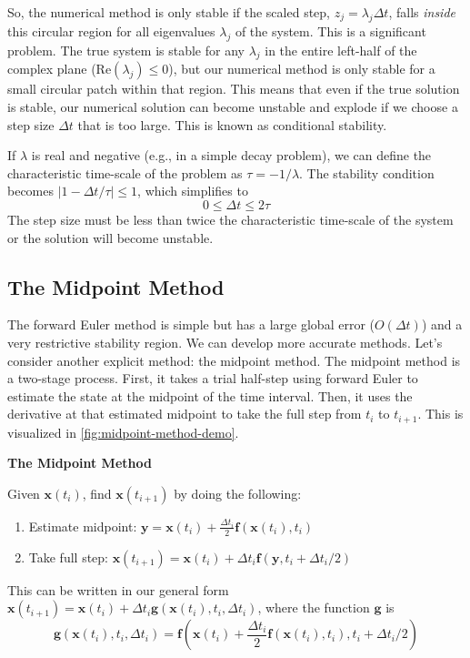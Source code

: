 So, the numerical method is only stable if the scaled step, $z_j = \lambda_j \Delta t$, falls \textit{inside} this circular region for all eigenvalues $\lambda_j$ of the system. This is a significant problem. The true system is stable for any $\lambda_j$ in the entire left-half of the complex plane ($\text{Re}(\lambda_j) \le 0$), but our numerical method is only stable for a small circular patch within that region. This means that even if the true solution is stable, our numerical solution can become unstable and explode if we choose a step size $\Delta t$ that is too large. This is known as conditional stability.

If $\lambda$ is real and negative (e.g., in a simple decay problem), we can define the characteristic time-scale of the problem as $\tau = -1/\lambda$. The stability condition becomes $|1 - \Delta t / \tau| \le 1$, which simplifies to
\begin{equation}
    0 \le \Delta t \le 2\tau
\end{equation}
The step size must be less than twice the characteristic time-scale of the system or the solution will become unstable.

\subsection{The Midpoint Method}

The forward Euler method is simple but has a large global error ($O(\Delta t)$) and a very restrictive stability region. We can develop more accurate methods. Let's consider another explicit method: the midpoint method. The midpoint method is a two-stage process. First, it takes a trial half-step using forward Euler to estimate the state at the midpoint of the time interval. Then, it uses the derivative at that estimated midpoint to take the full step from $t_i$ to $t_{i+1}$. This is visualized in \autoref{fig:midpoint-method-demo}.

\begin{definitionBox}
    \textbf{The Midpoint Method}

    Given $\mathbf{x}(t_i)$, find $\mathbf{x}(t_{i+1})$ by doing the following:
    \begin{enumerate}
        \item Estimate midpoint: $\mathbf{y} = \mathbf{x}(t_i) + \frac{\Delta t_i}{2} \mathbf{f}(\mathbf{x}(t_i), t_i)$
        \item Take full step: $\mathbf{x}(t_{i+1}) = \mathbf{x}(t_i) + \Delta t_i \mathbf{f}(\mathbf{y}, t_i + \Delta t_i/2)$
    \end{enumerate}
    This can be written in our general form $\mathbf{x}(t_{i+1}) = \mathbf{x}(t_i) + \Delta t_i \mathbf{g}(\mathbf{x}(t_i), t_i, \Delta t_i)$, where the function $\mathbf{g}$ is
    \begin{equation}
        \mathbf{g}(\mathbf{x}(t_i), t_i, \Delta t_i) = \mathbf{f}\left( \mathbf{x}(t_i) + \frac{\Delta t_i}{2}\mathbf{f}(\mathbf{x}(t_i), t_i), t_i + \Delta t_i/2 \right)
    \end{equation}
\end{definitionBox}

